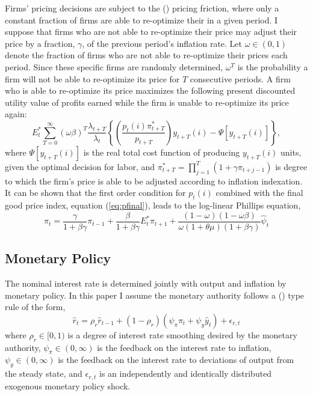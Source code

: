 \documentclass[12pt]{article}
\newcommand{\beq}{\begin{equation}}
\newcommand{\eeq}{\end{equation}}
\newcommand{\citee}[1]{\citename{#1} (\citeyear{#1})}
\newcommand{\h}[1]{\hat{#1}}
\begin{document}
Firms' pricing decisions are subject to the \citee{calvo1983} pricing friction, where only a constant fraction of firms are able to re-optimize their in a given period.  I suppose that firms who are not able to re-optimize their price may adjust their price by a fraction, $\gamma$, of the previous period's inflation rate.  Let $\omega \in (0,1)$ denote the fraction of firms who are not able to re-optimize their prices each period.  Since these specific firms are randomly determined, $\omega^T$ is the probability a firm will not be able to re-optimize its price for $T$ consecutive periods.  A firm who is able to re-optimize its price maximizes the following present discounted utility value of profits earned while the firm is unable to re-optimize its price again:
\beq \label{eq:intprofit}
E_t^* \sum_{T=0}^{\infty} \left(\omega \beta \right)^{T} \frac{\lambda_{t+T}}{\lambda_t}
\left\{ \left(\frac{p_{t}(i) \pi_{t+T}^{*}}{p_{t+T}}\right) y_{t+T}(i) - \Psi\left[y_{t+T}(i)\right] \right\},
\eeq
where $\Psi\left[y_{t+T}(i)\right]$ is the real total cost function of producing $y_{t+T}(i)$ units, given the optimal decision for labor, and $\pi_{t+T}^{*} = \prod_{j=1}^{T} (1+\gamma \pi_{t+j-1})$ is degree to which the firm's price is able to be adjusted according to inflation indexation.  It can be shown that the first order condition for $p_{t}(i)$ combined with the final good price index, equation (\ref{eq:pfinal}), leads to the log-linear Phillips equation,
\beq \label{eq:phillips} \pi_t = \frac{\gamma}{1+\beta \gamma} \pi_{t-1} + \frac{\beta}{1+\beta\gamma} E_t^* \pi_{t+1} + \frac{(1-\omega)(1-\omega \beta)}{\omega (1+\theta \mu) (1+\beta \gamma)} \h{\psi}_t \eeq

\subsection{Monetary Policy}
The nominal interest rate is determined jointly with output and inflation by monetary policy.  In this paper I assume the monetary authority follows a \citee{taylor1993} type rule of the form,
\beq \label{eq:taylor} \h{r}_t = \rho_r \h{r}_{t-1} + (1-\rho_r) \left(\psi_{\pi} \pi_t + \psi_y \h{y}_t \right) + \epsilon_{r,t} \eeq
where $\rho_r \in [0,1)$ is a degree of interest rate smoothing desired by the monetary authority, $\psi_{\pi} \in (0,\infty)$ is the feedback on the interest rate to inflation, $\psi_y \in (0,\infty)$ is the feedback on the interest rate to deviations of output from the steady state, and $\epsilon_{r,t}$ is an independently and identically distributed exogenous monetary policy shock.
\end{document}
